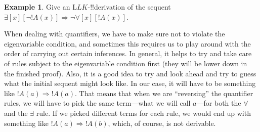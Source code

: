 \documentclass[10pt,a4paper]{article}
\theoremstyle{plain}
\theoremstyle{definition}
\newtheorem{ex}[thm]{Example}
\theoremstyle{remark}
\providecommand{\lforall}{\mathord{\forall}}
\providecommand{\lexists}{\mathord{\exists}}
\providecommand{\Sequent}{\mathrel{\Rightarrow}}
\providecommand{\Log}{\ensuremath{\mathrm{L}}}
\begin{document}
\begin{ex}
Give an $\Log{LK}$-!!{derivation} of the sequent $\lexists[x][\lnot !A(x)]
\Sequent \lnot \lforall[x][!A(x)]$.

When dealing with quantifiers, we have to make sure not to violate the
eigenvariable condition, and sometimes this requires us to play around
with the order of carrying out certain inferences. In general, it
helps to try and take care of rules subject to the eigenvariable
condition first (they will be lower down in the finished proof). Also,
it is a good idea to try and look ahead and try to guess what the
initial sequent might look like. In our case, it will have to be
something like $!A(a) \Sequent !A(a)$. That means that when we are
``reversing'' the quantifier rules, we will have to pick the same
term---what we will call $a$---for both the $\lforall$ and the
$\lexists$ rule. If we picked different terms for each rule, we would
end up with something like $!A(a) \Sequent !A(b)$, which, of course,
is not derivable.


\end{ex}
\end{document}
